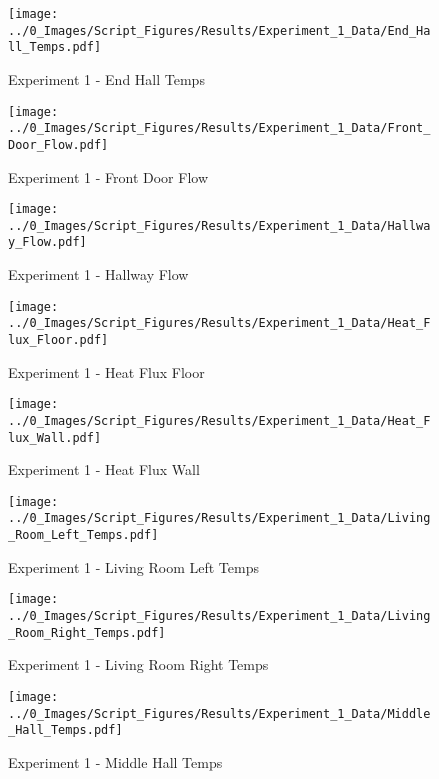 	\begin{figure}[H]
		\centering
		\texttt{[image: ../0\_Images/Script\_Figures/Results/Experiment\_1\_Data/End\_Hall\_Temps.pdf]}
		\caption[]{Experiment 1 - End Hall Temps}
	\end{figure}
 
	\clearpage

	\begin{figure}[H]
		\centering
		\texttt{[image: ../0\_Images/Script\_Figures/Results/Experiment\_1\_Data/Front\_Door\_Flow.pdf]}
		\caption[]{Experiment 1 - Front Door Flow}
	\end{figure}
 

	\begin{figure}[H]
		\centering
		\texttt{[image: ../0\_Images/Script\_Figures/Results/Experiment\_1\_Data/Hallway\_Flow.pdf]}
		\caption[]{Experiment 1 - Hallway Flow}
	\end{figure}
 
	\clearpage

	\begin{figure}[H]
		\centering
		\texttt{[image: ../0\_Images/Script\_Figures/Results/Experiment\_1\_Data/Heat\_Flux\_Floor.pdf]}
		\caption[]{Experiment 1 - Heat Flux Floor}
	\end{figure}
 

	\begin{figure}[H]
		\centering
		\texttt{[image: ../0\_Images/Script\_Figures/Results/Experiment\_1\_Data/Heat\_Flux\_Wall.pdf]}
		\caption[]{Experiment 1 - Heat Flux Wall}
	\end{figure}
 
	\clearpage

	\begin{figure}[H]
		\centering
		\texttt{[image: ../0\_Images/Script\_Figures/Results/Experiment\_1\_Data/Living\_Room\_Left\_Temps.pdf]}
		\caption[]{Experiment 1 - Living Room Left Temps}
	\end{figure}
 

	\begin{figure}[H]
		\centering
		\texttt{[image: ../0\_Images/Script\_Figures/Results/Experiment\_1\_Data/Living\_Room\_Right\_Temps.pdf]}
		\caption[]{Experiment 1 - Living Room Right Temps}
	\end{figure}
 
	\clearpage

	\begin{figure}[H]
		\centering
		\texttt{[image: ../0\_Images/Script\_Figures/Results/Experiment\_1\_Data/Middle\_Hall\_Temps.pdf]}
		\caption[]{Experiment 1 - Middle Hall Temps}
	\end{figure}
 

